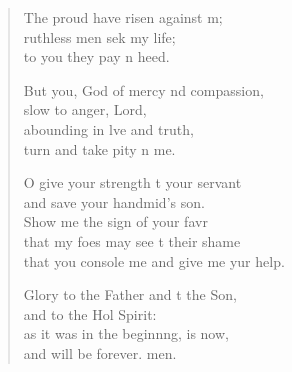 \begin{verse}
\begin{patverse}
The proud have risen against m;\Flex\\
ruthless men sek my life;\Med\\
to you they pay n heed.

But you, God of mercy nd compassion,\Med\\
slow to anger,  Lord,\\
abounding in lve and truth,\Med\\
turn and take pity n me.

O give your strength t your servant\Med\\
and save your handmid’s son.\\
Show me the sign of your favr\Flex\\
that my foes may see t their shame\Med\\
that you console me and give me yur help.

Glory to the Father and t the Son,\Med\\
and to the Hol Spirit:\\
as it was in the beginnng, is now,\Med\\
and will be forever. men.
  \end{patverse}
\end{verse}
